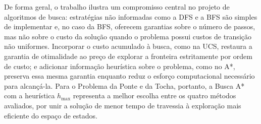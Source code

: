 De forma geral, o trabalho ilustra um compromisso central no projeto de
algoritmos de busca: estratégias não informadas como a DFS e a BFS são
simples de implementar e, no caso da BFS, oferecem garantias sobre o
número de passos, mas não sobre o custo da solução quando o problema
possui custos de transição não uniformes. Incorporar o custo acumulado à
busca, como na UCS, restaura a garantia de otimalidade ao preço de
explorar a fronteira estritamente por ordem de custo; e adicionar
informação heurística sobre o problema, como no A*, preserva essa mesma
garantia enquanto reduz o esforço computacional necessário para alcançá-la.
Para o Problema da Ponte e da Tocha, portanto, a Busca A* com a heurística
$h_{\max}$ representa a melhor escolha entre os quatro métodos avaliados,
por unir a solução de menor tempo de travessia à exploração mais eficiente
do espaço de estados.
